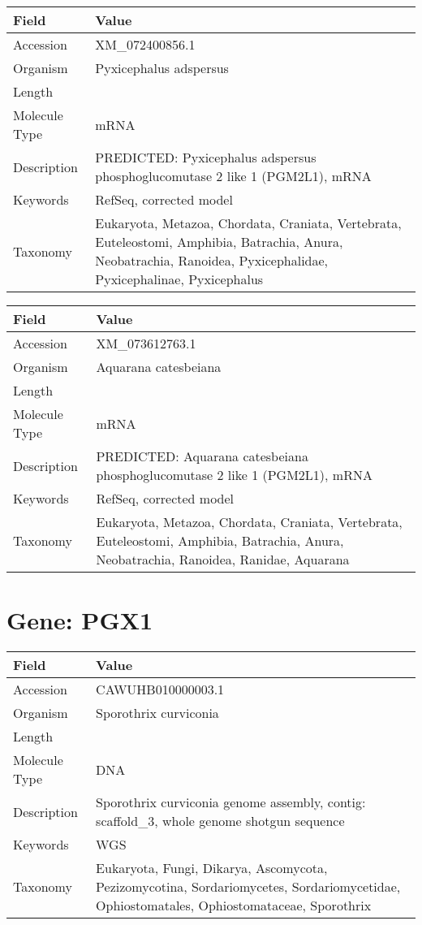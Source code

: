 \documentclass[10pt]{article}
\begin{document}
\vspace{1em}
{\footnotesize
\begin{longtable}{>{\raggedright\arraybackslash}p{4.5cm} >{\raggedright\arraybackslash}p{11.5cm}}
\textbf{Field} & \textbf{Value} \\
\hline
Accession & XM\_072400856.1 \\
Organism & Pyxicephalus adspersus \\
Length & 3347 \\
Molecule Type & mRNA \\
Description & PREDICTED: Pyxicephalus adspersus phosphoglucomutase 2 like 1 (PGM2L1), mRNA \\
Keywords & RefSeq, corrected model \\
Taxonomy & Eukaryota, Metazoa, Chordata, Craniata, Vertebrata, Euteleostomi, Amphibia, Batrachia, Anura, Neobatrachia, Ranoidea, Pyxicephalidae, Pyxicephalinae, Pyxicephalus \\
\end{longtable}
}

\vspace{1em}
{\footnotesize
\begin{longtable}{>{\raggedright\arraybackslash}p{4.5cm} >{\raggedright\arraybackslash}p{11.5cm}}
\textbf{Field} & \textbf{Value} \\
\hline
Accession & XM\_073612763.1 \\
Organism & Aquarana catesbeiana \\
Length & 9202 \\
Molecule Type & mRNA \\
Description & PREDICTED: Aquarana catesbeiana phosphoglucomutase 2 like 1 (PGM2L1), mRNA \\
Keywords & RefSeq, corrected model \\
Taxonomy & Eukaryota, Metazoa, Chordata, Craniata, Vertebrata, Euteleostomi, Amphibia, Batrachia, Anura, Neobatrachia, Ranoidea, Ranidae, Aquarana \\
\end{longtable}
}

\vspace{1em}
\section{Gene: PGX1}
{\footnotesize
\begin{longtable}{>{\raggedright\arraybackslash}p{4.5cm} >{\raggedright\arraybackslash}p{11.5cm}}
\textbf{Field} & \textbf{Value} \\
\hline
Accession & CAWUHB010000003.1 \\
Organism & Sporothrix curviconia \\
Length & 1228168 \\
Molecule Type & DNA \\
Description & Sporothrix curviconia genome assembly, contig: scaffold\_3, whole genome shotgun sequence \\
Keywords & WGS \\
Taxonomy & Eukaryota, Fungi, Dikarya, Ascomycota, Pezizomycotina, Sordariomycetes, Sordariomycetidae, Ophiostomatales, Ophiostomataceae, Sporothrix \\
\end{longtable}
}
\end{document}
